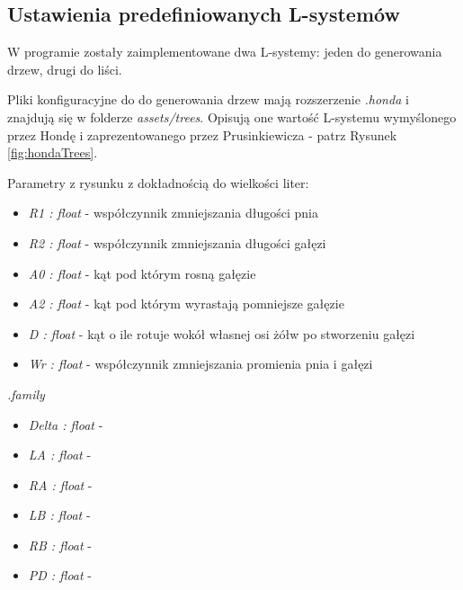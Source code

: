 \documentclass[inz,longabstract]{iithesis}
\begin{document}
        \subsection{Ustawienia predefiniowanych L-systemów}
        W programie zostały zaimplementowane dwa L-systemy: jeden do generowania drzew, drugi do liści.
        
        Pliki konfiguracyjne do do generowania drzew mają rozszerzenie \textit{.honda} i znajdują się w folderze \textit{assets/trees}. Opisują one wartość L-systemu wymyślonego przez Hondę\cite{honda} i zaprezentowanego przez Prusinkiewicza\cite{plants} - patrz Rysunek \ref{fig:hondaTrees}.
        
        Parametry z rysunku z dokładnością do wielkości liter:
        \begin{itemize}
            \item \textit{R1 : float} - współczynnik zmniejszania długości pnia
            \item \textit{R2 : float} - współczynnik zmniejszania długości gałęzi
            \item \textit{A0 : float} - kąt pod którym rosną gałęzie
            \item \textit{A2 : float} - kąt pod którym wyrastają pomniejsze gałęzie
            \item \textit{D : float} - kąt o ile rotuje wokół własnej osi żółw po stworzeniu gałęzi
            \item \textit{Wr : float} - współczynnik zmniejszania promienia pnia i gałęzi
        \end{itemize}    
        
        \textit{.family}
        \begin{itemize}
            \item \textit{Delta : float} -
            \item \textit{LA : float} -
            \item \textit{RA : float} -
            \item \textit{LB : float} -
            \item \textit{RB : float} -
            \item \textit{PD : float} -
        \end{itemize}    
        
\end{document}
